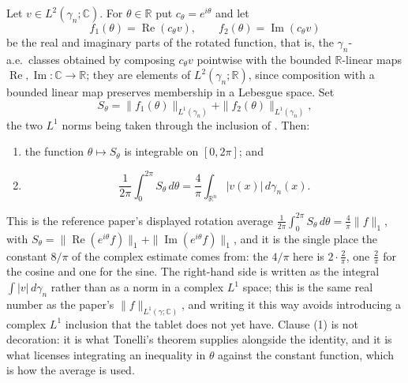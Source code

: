 \begin{lemma}
Let $v \in L^2(\gamma_n;\mathbb{C})$.  For $\theta \in \mathbb{R}$ put
$c_\theta = e^{i\theta}$ and let
\[
  f_1(\theta) = \operatorname{Re}(c_\theta v), \qquad
  f_2(\theta) = \operatorname{Im}(c_\theta v)
\]
be the real and imaginary parts of the rotated function, that is, the
$\gamma_n$-a.e.\ classes obtained by composing $c_\theta v$ pointwise with the
bounded $\mathbb{R}$-linear maps $\operatorname{Re},\operatorname{Im} :
\mathbb{C} \to \mathbb{R}$; they are elements of $L^2(\gamma_n;\mathbb{R})$,
since composition with a bounded linear map preserves membership in a Lebesgue
space.  Set
\[
  S_\theta = \|f_1(\theta)\|_{L^1(\gamma_n)} + \|f_2(\theta)\|_{L^1(\gamma_n)} ,
\]
the two $L^1$ norms being taken through the inclusion of .  Then:
\begin{enumerate}
\item the function $\theta \mapsto S_\theta$ is integrable on $[0,2\pi]$; and
\item
\[
  \frac{1}{2\pi}\int_0^{2\pi} S_\theta \, d\theta
    = \frac{4}{\pi}\int_{\mathbb{R}^n} |v(x)| \, d\gamma_n(x) .
\]
\end{enumerate}

This is the reference paper's displayed rotation average
$\frac{1}{2\pi}\int_0^{2\pi}S_\theta\,d\theta = \frac{4}{\pi}\|f\|_1$, with
$S_\theta = \|\operatorname{Re}(e^{i\theta}f)\|_1 + \|\operatorname{Im}(e^{i\theta}f)\|_1$,
and it is the single place the constant $8/\pi$ of the complex estimate comes
from: the $4/\pi$ here is $2 \cdot \frac{2}{\pi}$, one $\frac{2}{\pi}$ for the
cosine and one for the sine.  The right-hand side is written as the integral
$\int|v|\,d\gamma_n$ rather than as a norm in a complex $L^1$ space; this is the
same real number as the paper's $\|f\|_{L^1(\gamma;\mathbb{C})}$, and writing it
this way avoids introducing a complex $L^1$ inclusion that the tablet does not
yet have.  Clause (1) is not decoration: it is what Tonelli's theorem supplies
alongside the identity, and it is what licenses integrating an inequality in
$\theta$ against the constant function, which is how the average is used.
\end{lemma}
